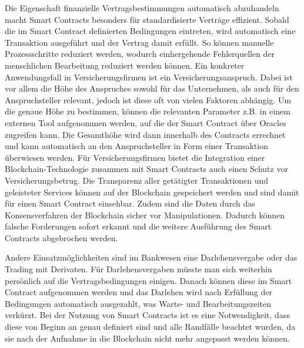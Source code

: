 Die Eigenschaft finanzielle Vertragsbestimmungen automatisch abzuhandeln macht Smart Contracts 
besonders für standardisierte Verträge effizient. Sobald die im Smart Contract definierten Bedingungen
eintreten, wird automatisch eine Transaktion ausgeführt und der Vertrag damit erfüllt.
So können manuelle Prozessschritte reduziert werden, wodurch einhergehende Fehlerquellen
der menschlichen Bearbeitung reduziert werden können. 
Ein konkreter Anwendungsfall in Versicherungsfirmen ist ein Versicherungsanspruch.
\cite[p.~168f]{chowdhary2025smart}
Dabei ist vor allem die Höhe des Anspruches sowohl für das Unternehmen, als auch für den
Anspruchsteller relevant, jedoch ist diese oft von vielen Faktoren abhängig. Um die genaue Höhe zu bestimmen,
können die relevanten Parameter z.B. in einem externen Tool aufgenommen werden, auf die der Smart Contract
über Oracles zugreifen kann. Die Gesamthöhe wird dann innerhalb des Contracts errechnet und kann automatisch
an den Anspruchsteller in Form einer Transaktion überwiesen werden. 
Für Versicherungsfirmen bietet die Integration einer Blockchain-Technologie zusammen mit Smart Contracts
auch einen Schutz vor Versicherungsbetrug. Die Transparenz aller getätigter Transaktionen
und geleisteter Services können auf der Blockchain gespeichert werden und sind damit für einen Smart Contract
einsehbar. Zudem sind die Daten durch das Konsensverfahren der Blockchain sicher vor 
Manipulationen. 
Dadurch können falsche Forderungen sofort erkannt und die weitere Ausführung des Smart
Contracts abgebrochen werden.
\cite[p.~10]{chenthara2021privacy}

Andere Einsatzmöglichkeiten sind im Bankwesen eine Darlehensvergabe oder das Trading
mit Derivaten. \cite[p.~168f]{chowdhary2025smart}
Für Darlehensvergaben müsste man sich weiterhin persönlich auf die Vertragsbedingungen 
einigen. Danach können diese im Smart Contract aufgenommen werden und das Darlehen wird 
 nach Erfüllung der Bedingungen automatisch ausgezahlt, was Warte- und Bearbeitungszeiten verkürzt.
\cite{Gronemann2018darlehen}
Bei der Nutzung von Smart Contracts ist es eine Notwendigkeit, dass diese von Beginn an genau 
definiert sind und alle Randfälle beachtet wurden, da sie nach der Aufnahme in die Blockchain 
nicht mehr angepasst werden können. 
\cite[p.~58]{fill2020blockchain}





